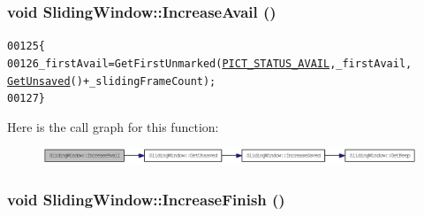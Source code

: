 \hypertarget{class_sliding_window_a7bce9e53d3618b89f47684ec1432848d}{
\subsubsection[{IncreaseAvail}]{\setlength{\rightskip}{0pt plus 5cm}void SlidingWindow::IncreaseAvail ()}}
\label{class_sliding_window_a7bce9e53d3618b89f47684ec1432848d}




\begin{footnotesize}\begin{alltt}
00125         \{
00126                 \_firstAvail = GetFirstUnmarked(\hyperlink{_picture_info_8h_aecbf7bf3158e75ca4906202b17b8f9ef}{PICT_STATUS_AVAIL}, \_firstAvail, 
      \hyperlink{class_sliding_window_a3df64e20282ce10a45c4c3f3011e536d}{GetUnsaved}() + \_slidingFrameCount);
00127         \}
\end{alltt}\end{footnotesize}




Here is the call graph for this function:\nopagebreak
\begin{figure}[H]
\begin{center}
\leavevmode
\includegraphics[width=356pt]{class_sliding_window_a7bce9e53d3618b89f47684ec1432848d_cgraph}
\end{center}
\end{figure}


\hypertarget{class_sliding_window_a8f303bc211297021f20e09dced119207}{
\subsubsection[{IncreaseFinish}]{\setlength{\rightskip}{0pt plus 5cm}void SlidingWindow::IncreaseFinish ()}}
\label{class_sliding_window_a8f303bc211297021f20e09dced119207}




